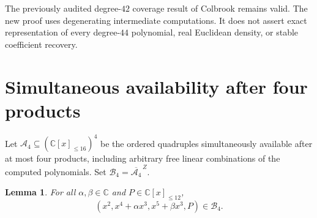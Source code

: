 \documentclass[11pt]{article}
\newtheorem{lemma}[theorem]{Lemma}
\newcommand{\C}{\mathbb C}
\newcommand{\V}[1]{\C[x]_{\le #1}}
\newcommand{\cl}{\overline}
\begin{document}
The previously audited degree-$42$ coverage result of Colbrook
\cite{Colbrook} remains valid. The new proof uses degenerating intermediate
computations. It does not assert exact representation of every degree-$44$
polynomial, real Euclidean density, or stable coefficient recovery.

\section{Simultaneous availability after four products}
Let $\mathcal A_4\subseteq(\V{16})^4$ be the ordered quadruples
simultaneously available after at most four products, including arbitrary
free linear combinations of the computed polynomials. Set
$\mathcal B_4=\cl{\mathcal A_4}^{\,Z}$.

\begin{lemma}\label{lem:border}
For all $\alpha,\beta\in\C$ and $P\in\V{12}$,
\[
 (x^2,x^4+\alpha x^3,x^5+\beta x^3,P)\in\mathcal B_4.
\]
\end{lemma}
\end{document}
